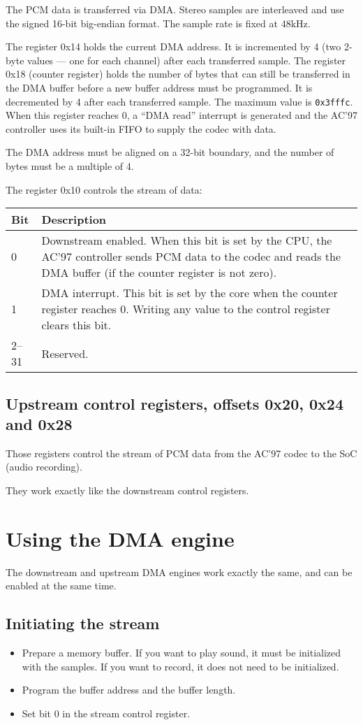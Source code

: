 \documentclass[a4paper,11pt]{article}
\begin{document}
The PCM data is transferred via DMA. Stereo samples are interleaved and use the signed 16-bit big-endian format. The sample rate is fixed at 48kHz.

The register 0x14 holds the current DMA address. It is incremented by 4 (two 2-byte values --- one for each channel) after each transferred sample.
The register 0x18 (counter register) holds the number of bytes that can still be transferred in the DMA buffer before a new buffer address must be programmed. It is decremented by 4 after each transferred sample. The maximum value is \verb!0x3fffc!. When this register reaches 0, a ``DMA read'' interrupt is generated and the AC'97 controller uses its built-in FIFO to supply the codec with data.

The DMA address must be aligned on a 32-bit boundary, and the number of bytes must be a multiple of 4.

The register 0x10 controls the stream of data:

\begin{tabularx}{\textwidth}{|l|X|}
\hline
\textbf{Bit} & \textbf{Description} \\
\hline
0 & Downstream enabled. When this bit is set by the CPU, the AC'97 controller sends PCM data to the codec and reads the DMA buffer (if the counter register is not zero). \\
\hline
1 & DMA interrupt. This bit is set by the core when the counter register reaches 0. Writing any value to the control register clears this bit. \\
\hline
2--31 & Reserved. \\
\hline
\end{tabularx}

\subsection{Upstream control registers, offsets 0x20, 0x24 and 0x28}
Those registers control the stream of PCM data from the AC'97 codec to the SoC (audio recording).

They work exactly like the downstream control registers.

\section{Using the DMA engine}
The downstream and upstream DMA engines work exactly the same, and can be enabled at the same time.

\subsection{Initiating the stream}
\begin{itemize}
\item Prepare a memory buffer. If you want to play sound, it must be initialized with the samples. If you want to record, it does not need to be initialized.
\item Program the buffer address and the buffer length.
\item Set bit 0 in the stream control register.
\end{itemize}
\end{document}
